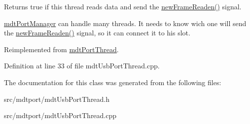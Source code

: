 Returns true if this thread reads data and send the \hyperlink{classmdt_port_thread_a7fc2245c753fd65e1beffec211c41461}{newFrameReaden()} signal. 

\hyperlink{classmdt_port_manager}{mdtPortManager} can handle many threads. It needs to know wich one will send the \hyperlink{classmdt_port_thread_a7fc2245c753fd65e1beffec211c41461}{newFrameReaden()} signal, so it can connect it to his slot. 

Reimplemented from \hyperlink{classmdt_port_thread_acdb3d96287c571cc08ef39860dc324b1}{mdtPortThread}.



Definition at line 33 of file mdtUsbPortThread.cpp.



The documentation for this class was generated from the following files:\begin{DoxyCompactItemize}
\item 
src/mdtport/mdtUsbPortThread.h\item 
src/mdtport/mdtUsbPortThread.cpp\end{DoxyCompactItemize}
